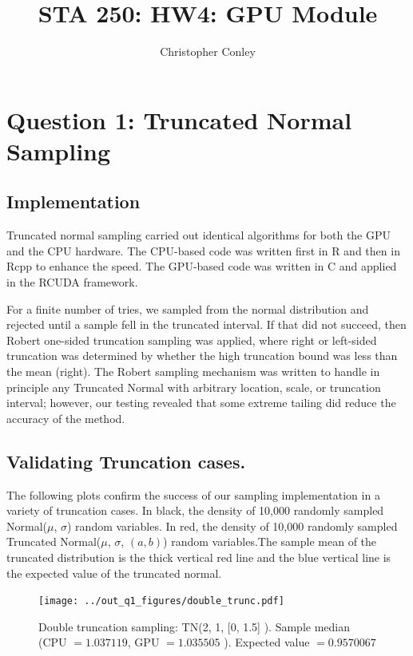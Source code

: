 \documentclass[9pt]{amsart}
\title{STA 250: HW4: GPU Module}
\author{Christopher Conley}
\date{}                                           %
\begin{document}
\maketitle
\tableofcontents
\doublespacing

\section{Question 1:  Truncated Normal Sampling}


\subsection{Implementation}

Truncated normal sampling carried out identical algorithms for both the GPU and the CPU hardware. The CPU-based code was written first in R and then in Rcpp to enhance the speed. The GPU-based code was written in C and applied in the RCUDA framework. 

 For a finite number of tries, we sampled from the normal distribution and rejected until a sample fell in the truncated interval. If that  did not succeed, then Robert one-sided truncation sampling was applied, where right or left-sided truncation was determined by whether the high truncation bound was less than the mean (right). The Robert sampling mechanism was written to handle in principle any Truncated Normal with arbitrary location, scale, or truncation interval; however, our testing revealed that some extreme tailing did reduce the accuracy of the method. \\ 

\subsection{Validating Truncation cases.}

The following plots confirm the success of our sampling implementation in a variety of truncation cases. In black, the density of 10,000 randomly sampled Normal($\mu$, $\sigma$) random variables. In red, the density of 10,000 randomly sampled Truncated Normal($\mu$, $\sigma$, $(a , b)$) random variables.The sample mean of the truncated distribution is the thick vertical red line and the blue vertical line is the expected value of the truncated normal.

\begin{figure}[htbp] %
   \centering
   \texttt{[image: ../out\_q1\_figures/double\_trunc.pdf]} 
   \caption{Double truncation sampling:  TN\Big (2, 1, [0, 1.5] \Big ). Sample median (CPU $= 1.037119$, GPU $=1.035505 $ ). Expected value $= 0.9570067$} 
   \label{fig:dtrunc}
\end{figure}
\end{document}
